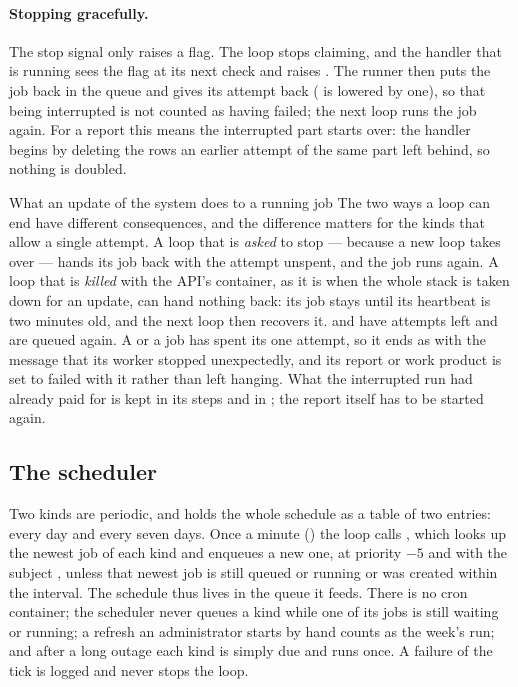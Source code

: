 \paragraph{Stopping gracefully.} The stop signal only raises a flag. The loop stops
claiming, and the handler that is running sees the flag at its next check and raises
. The runner then puts the job back in the queue and gives its attempt
back ( is lowered by one), so that being interrupted is not counted as having
failed; the next loop runs the job again. For a report this means the interrupted part
starts over: the handler begins by deleting the rows an earlier attempt of the same part
left behind, so nothing is doubled.

\begin{notebox}{What an update of the system does to a running job}
The two ways a loop can end have different consequences, and the difference matters for the
kinds that allow a single attempt. A loop that is \emph{asked} to stop --- because a new loop
takes over --- hands its job back with the attempt unspent, and the job runs again. A loop
that is \emph{killed} with the API's container, as it is when the whole stack is taken down
for an update, can hand nothing back: its job stays  until its heartbeat is two
minutes old, and the next loop then recovers it.  and
 have attempts left and are queued again. A  or a
 job has spent its one attempt, so it ends as  with the
message that its worker stopped unexpectedly, and its report or work product is set to failed
with it rather than left hanging. What the interrupted run had already paid for is kept in
its steps and in ; the report itself has to be started again.
\end{notebox}

\subsection{The scheduler}

Two kinds are periodic, and  holds the whole schedule as a table of
two entries:  every day and  every seven days.
Once a minute () the loop calls , which looks up the
newest job of each kind and enqueues a new one, at priority $-5$ and with the subject
, unless that newest job is still queued or running or was created
within the interval. The schedule thus lives in the queue it feeds. There is no cron
container; the scheduler never queues a kind while one of its jobs is still waiting or running; a refresh an administrator starts by
hand counts as the week's run; and after a long outage each kind is simply due and runs
once. A failure of the tick is logged and never stops the loop.


